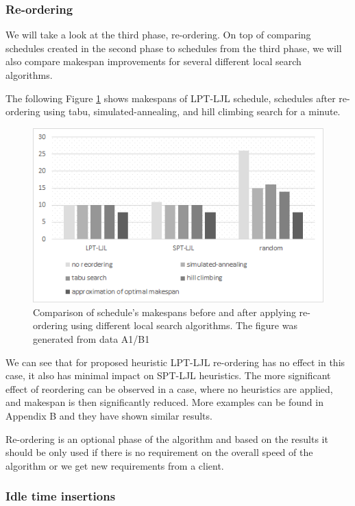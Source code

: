 \documentclass{ctuthesis}
\begin{document}
\subsubsection{Re-ordering}
\label{subsubsec:reordering}
We will take a look at the third phase, re-ordering. On top of comparing schedules created in the second phase to schedules from the third phase, we will also compare makespan improvements for several different local search algorithms.

The following Figure \ref{fig:reor1} shows makespans of LPT-LJL schedule, schedules after re-ordering using tabu, simulated-annealing, and hill climbing search for a minute.

\begin{figure}[H]
\includegraphics[width=1\linewidth]{reor1.png}
\caption{Comparison of schedule's makespans before and after applying re-ordering using different local search algorithms. The figure was generated from data A1/B1}
\label{fig:reor1}
\end{figure}

We can see that for proposed heuristic LPT-LJL re-ordering has no effect in this case, it also has minimal impact on SPT-LJL heuristics. The more significant effect of reordering can be observed in a case, where no heuristics are applied, and makespan is then significantly reduced. More examples can be found in Appendix B and they have shown similar results.

Re-ordering is an optional phase of the algorithm and based on the results it should be only used if there is no requirement on the overall speed of the algorithm or we get new requirements from a client. 

\subsubsection{Idle time insertions}
\label{subsubsec:idletimeinsertions}
\end{document}
